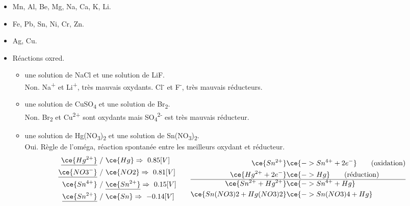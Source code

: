 \documentclass[
  11pt,
  a4paper,
  openany]{book}
\providecommand{\tightlist}{%
  \setlength{\itemsep}{0pt}\setlength{\parskip}{0pt}}
\begin{document}
\begin{Answer}

\begin{itemize}
\tightlist
\item
  Mn, Al, Be, Mg, Na, Ca, K, Li.
\item
  Fe, Pb, Sn, Ni, Cr, Zn.
\item
  Ag, Cu.
\item
  Réactions oxred.

  \begin{itemize}
  \tightlist
  \item
    une solution de NaCl et une solution de LiF.\\
    Non. Na\textsuperscript{+} et Li\textsuperscript{+}, très mauvais oxydants. Cl\textsuperscript{-} et F\textsuperscript{-}, très mauvais réducteurs.
  \item
    une solution de CuSO\textsubscript{4} et une solution de Br\textsubscript{2}.\\
    Non. Br\textsubscript{2} et Cu\textsuperscript{2+} sont oxydants mais SO\textsubscript{4}\textsuperscript{2-} est très mauvais réducteur.
  \item
    une solution de Hg(NO\textsubscript{3})\textsubscript{2} et une solution de Sn(NO\textsubscript{3})\textsubscript{2}.\\
    Oui. Règle de l'oméga, réaction spontanée entre les meilleurs oxydant et réducteur.\\
    \[
      \begin{split}
    \underline{\ce{Hg^{2+}}}\ & /\    \ce{Hg} \Rightarrow\ 0.85 [V] \\
    \underline{\ce{NO3^{-}}}\ & /\    \ce{NO2} \Rightarrow\ 0.81 [V] \\
    \ce{Sn^{4+}}\ & /\ \underline{\ce{Sn^{2+}}} \Rightarrow\ 0.15 [V] \\
    \underline{\ce{Sn^{2+}}}\ & /\ \ce{Sn} \Rightarrow\ -0.14 [V]
      \end{split}
      \qquad
      \begin{split}
      \ce{Sn^{2+}} & \ce{ -> Sn^{4+} + 2 e^-} \qquad \text{(oxidation)} \\
      \ce{Hg^{2+} + 2 e^-} & \ce{ -> Hg} \qquad \text{(réduction)} \\
      \hline
      \ce{Sn^{2+} + Hg^{2+}} & \ce{ -> Sn^{4+} + Hg} \\
      \ce{Sn(NO3)2 + Hg(NO3)2} & \ce{ -> Sn(NO3)4 + Hg}
      \end{split}
      \]
  \end{itemize}
\end{itemize}

\end{Answer}
\end{document}
